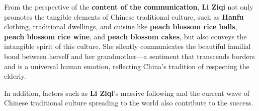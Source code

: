 From the perspective of the \textbf{content of the communication}, \textbf{Li Ziqi} not only promotes the tangible elements of Chinese traditional culture, such as \textbf{Hanfu} clothing, traditional dwellings, and cuisine like \textbf{peach blossom rice balls}, \textbf{peach blossom rice wine}, and \textbf{peach blossom cakes}, but also conveys the intangible spirit of this culture. She silently communicates the beautiful familial bond between herself and her grandmother—a sentiment that transcends borders and is a universal human emotion, reflecting China's tradition of respecting the elderly.

In addition, factors such as \textbf{Li Ziqi}'s massive following and the current wave of Chinese traditional culture spreading to the world also contribute to the success.